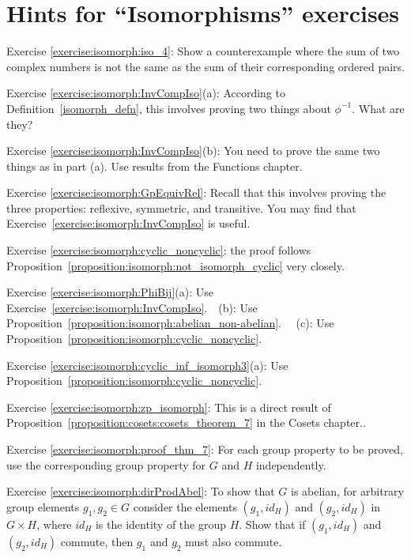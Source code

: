 \section{Hints for ``Isomorphisms'' exercises}
\label{sec:Isomorphism:Hints} 


\noindent Exercise \ref{exercise:isomorph:iso_4}:  Show a counterexample where the sum of two complex numbers is not the same as the sum of their corresponding ordered pairs.

\noindent Exercise \ref{exercise:isomorph:InvCompIso}(a):  According to Definition~\ref{isomorph_defn}, this involves proving two things about $\phi^{-1}$.  What are they?

\noindent Exercise \ref{exercise:isomorph:InvCompIso}(b): You need to prove the same two things as in part (a).  Use results from the Functions chapter.

\noindent Exercise \ref{exercise:isomorph:GpEquivRel}:   Recall that this involves proving the three properties: reflexive, symmetric, and transitive. You may find that Exercise~\ref{exercise:isomorph:InvCompIso}  is useful.

\noindent Exercise \ref{exercise:isomorph:cyclic_noncyclic}:   the proof follows Proposition~\ref{proposition:isomorph:not_isomorph_cyclic} very closely.

\noindent Exercise \ref{exercise:isomorph:PhiBij}(a): Use Exercise~\ref{exercise:isomorph:InvCompIso}.~~(b):  Use Proposition~\ref{proposition:isomorph:abelian_non-abelian}. ~~(c):  Use Proposition~\ref{proposition:isomorph:cyclic_noncyclic}. 

\noindent Exercise \ref{exercise:isomorph:cyclic_inf_isomorph3}(a): Use Proposition~\ref{proposition:isomorph:cyclic_noncyclic}.

\noindent Exercise \ref{exercise:isomorph:zp_isomorph}: This  is a direct result of Proposition~\ref{proposition:cosets:cosets_theorem_7} in the Cosets chapter..

\noindent Exercise \ref{exercise:isomorph:proof_thm_7}: For each group property to be proved, use the corresponding group property for $G$ and $H$ independently.

\noindent Exercise \ref{exercise:isomorph:dirProdAbel}: To show that $G$ is abelian, for arbitrary group elements $g_1, g_2 \in G$ consider the elements $(g_1, id_H)$ and $(g_2,id_H)$ in $G \times H$, where $id_H$ is the identity of the group $H$.  Show that if $(g_1, id_H)$ and $(g_2,id_H)$ commute, then $g_1$ and $g_2$ must also commute. 


